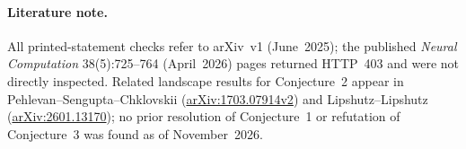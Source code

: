 \documentclass[11pt]{article}
\theoremstyle{plain}
\theoremstyle{definition}
\theoremstyle{remark}
\begin{document}
\paragraph{Literature note.}
All printed-statement checks refer to arXiv~v1 (June~2025); the published \emph{Neural Computation} 38(5):725--764 (April~2026) pages returned HTTP~403 and were not directly inspected. Related landscape results for Conjecture~2 appear in Pehlevan--Sengupta--Chklovskii (\href{https://arxiv.org/abs/1703.07914}{arXiv:1703.07914v2}) and Lipshutz--Lipshutz (\href{https://arxiv.org/abs/2601.13170}{arXiv:2601.13170}); no prior resolution of Conjecture~1 or refutation of Conjecture~3 was found as of November~2026.
\end{document}
